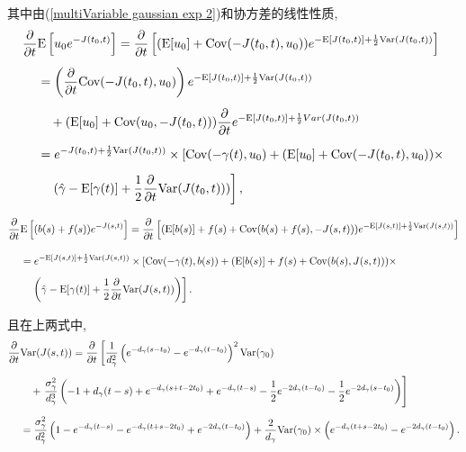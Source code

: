 \documentclass[notitlepage,cs4size,punct,oneside]{ctexrep}
\numberwithin{equation}{section}
\theoremstyle{mystyle}
\newcommand{\nq}{\\[5pt]}
\newcommand{\nw}{\\[10pt]}
\begin{document}
其中由(\ref{multiVariable gaussian exp 2})和协方差的线性性质,
\[
\begin{split}
\frac{\partial}{\partial t}&\E\left[u_0e^{-J(t_0, t)}\right] = \frac{\partial}{\partial t}\left[(\E[u_0]+\Cov(-J(t_0, t), u_0))e^{-\E[J(t_0, t)]+\frac{1}{2}\Var(J(t_0, t))}\right] \nq
&= \left(\frac{\partial}{\partial t}\Cov(-J(t_0, t), u_0)\right)e^{-\E[J(t_0, t)]+\frac{1}{2}\Var(J(t_0, t))} \nq
&\quad + (\E[u_0] + \Cov(u_0, -J(t_0, t)))\frac{\partial}{\partial t}e^{-\E[J(t_0, t)]+\frac{1}{2}Var(J(t_0, t))} \nq
&= e^{-J(t_0, t)+\frac{1}{2}\Var(J(t_0, t))}\times\left[\Cov(-\gamma(t), u_0)+(\E[u_0]+\Cov(-J(t_0, t), u_0))\times\right. \nq
&\quad \left.(\hat\gamma-\E[\gamma(t)]+\frac{1}{2}\frac{\partial}{\partial t}\Var(J(t_0, t)))\right],
\end{split}
\]

\[
\begin{split}
\frac{\partial}{\partial t}&\E\left[(b(s)+f(s))e^{-J(s, t)}\right] = \frac{\partial}{\partial t}\left[(\E[b(s)]+f(s)+\Cov(b(s)+f(s), -J(s, t)))e^{-\E[J(s, t)]+\frac{1}{2}\Var(J(s, t))}\right] \nw
&= e^{-\E[J(s, t)]+\frac{1}{2}\Var(J(s, t))}\times\left[\Cov(-\gamma(t), b(s))+(\E[b(s)]+f(s)+\Cov(b(s), J(s, t)))\times \right. \nq
&\quad \left.\left(\hat\gamma - \E[\gamma(t)]+\frac{1}{2}\frac{\partial}{\partial t}\Var(J(s, t))\right)\right].
\end{split}
\]

且在上两式中,
\[
\begin{split}
\frac{\partial}{\partial t}&\Var(J(s, t)) = \frac{\partial}{\partial t}\left[\frac{1}{d_\gamma^2}\left(e^{-d_\gamma(s-t_0)}-e^{-d_\gamma(t-t_0)}\right)^2\Var(\gamma_0)\right. \nq
&\quad+ \left.\frac{\sigma_\gamma^2}{d_\gamma^3}\left(-1+d_\gamma(t-s)+e^{-d_\gamma(s+t-2t_0)}+e^{-d_\gamma(t-s)}-\frac{1}{2}e^{-2d_\gamma(t-t_0)}-\frac{1}{2}e^{-2d_\gamma(s-t_0)}\right)\right] \nq
&= \frac{\sigma_\gamma^2}{d_\gamma^2}\left(1-e^{-d_\gamma(t-s)}-e^{-d_\gamma(t+s-2t_0)}+e^{-2d_\gamma(t-t_0)}\right)+\frac{2}{d_\gamma}\Var(\gamma_0)\times\left(e^{-d_\gamma(t+s-2t_0)}-e^{-2d_\gamma(t-t_0)}\right).
\end{split}
\]
\\
\end{document}
